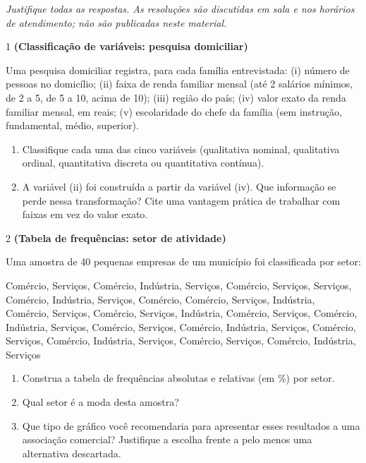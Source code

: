 \documentclass[11pt]{article}
\begin{document}

\noindent \textit{Justifique todas as respostas. As resoluções são discutidas em sala e nos horários de atendimento; não são publicadas neste material.}

\begin{questao}{1} \textbf{(Classificação de variáveis: pesquisa domiciliar)}

Uma pesquisa domiciliar registra, para cada família entrevistada: (i) número de pessoas no
domicílio; (ii) faixa de renda familiar mensal (até 2 salários mínimos, de 2 a 5, de 5 a 10, acima
de 10); (iii) região do país; (iv) valor exato da renda familiar mensal, em reais; (v) escolaridade
do chefe da família (sem instrução, fundamental, médio, superior).

\begin{enumerate}[label=(\alph*)]
  \item Classifique cada uma das cinco variáveis (qualitativa nominal, qualitativa ordinal,
    quantitativa discreta ou quantitativa contínua).
  \item A variável (ii) foi construída a partir da variável (iv). Que informação se perde nessa
    transformação? Cite uma vantagem prática de trabalhar com faixas em vez do valor exato.
\end{enumerate}
\end{questao}

\begin{questao}{2} \textbf{(Tabela de frequências: setor de atividade)}

Uma amostra de 40 pequenas empresas de um município foi classificada por setor:

\begin{center}
Comércio, Serviços, Comércio, Indústria, Serviços, Comércio, Serviços, Serviços, Comércio,
Indústria, Serviços, Comércio, Comércio, Serviços, Indústria, Comércio, Serviços, Comércio,
Serviços, Indústria, Comércio, Serviços, Comércio, Indústria, Serviços, Comércio, Serviços,
Comércio, Indústria, Serviços, Comércio, Serviços, Comércio, Indústria, Serviços, Comércio,
Serviços, Comércio, Indústria, Serviços
\end{center}

\begin{enumerate}[label=(\alph*)]
  \item Construa a tabela de frequências absolutas e relativas (em \%) por setor.
  \item Qual setor é a moda desta amostra?
  \item Que tipo de gráfico você recomendaria para apresentar esses resultados a uma associação
    comercial? Justifique a escolha frente a pelo menos uma alternativa descartada.
\end{enumerate}
\end{questao}
\end{document}

